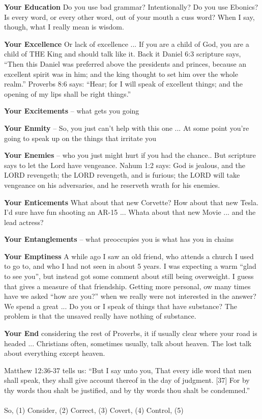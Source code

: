 
\begin{compactenum}[I.][10]
    \item \textbf{Your Education} Do you use bad grammar? Intentionally?  Do you use Ebonics?  Is every word, or every other word, out of your mouth a cuss word?  When I say, though, what I really mean is wisdom. 
    \item \textbf{Your Excellence} Or lack of excellence ... If you are a child of God, you are a child of THE King and should talk like it. Back it Daniel 6:3 scripture says, ``Then this Daniel was preferred above the presidents and princes, because an excellent spirit was in him; and the king thought to set him over the whole realm.'' Proverbs 8:6 says: ``Hear; for I will speak of excellent things; and the opening of my lips shall be right things.''
    \item \textbf{Your Excitements} -- what gets you going
    \item \textbf{Your Enmity} -- So, you just can't help with this one ... At some point you're going to speak up on the things that irritate you 
    \item \textbf{Your Enemies} -- who you just might hurt if you had the chance.. But scripture says to let the Lord have vengeance. Nahum 1:2 says: God is jealous, and the LORD revengeth; the LORD revengeth, and is furious; the LORD will take vengeance on his adversaries, and he reserveth wrath for his enemies.
    \item \textbf{Your Enticements} What about that new Corvette?  How about that new Tesla.  I'd sure have fun shooting an AR-15 ... Whata about that new Movie ... and the lead actress?
    \item \textbf{Your Entanglements} -- what preoccupies you is what has you in chains
    \item \textbf{Your Emptiness} A while ago I saw an old friend, who attends a church I used to go to, and who I had not seen in about 5 years. I was expecting a warm ``glad to see you'', but instead got some comment about still being overweight. I guess that gives a measure of that friendship.  Getting more personal, ow many times have we asked ``how are you?'' when we really were not interested in the answer? We spend a great ... Do you or I speak of things that have substance? The problem is that the unsaved really have nothing of substance.
   \item \textbf{Your End} considering the rest of Proverbs, it if usually clear where your road is headed ... Christians often, sometimes usually, talk about heaven.  The lost talk about everything except heaven.  
\end{compactenum}
Matthew 12:36-37 tells us: ``But I say unto you, That every idle word that men shall speak, they shall give account thereof in the day of judgment. [37] For by thy words thou shalt be justified, and by thy words thou shalt be condemned.''\\
\\
So, (1) Consider, (2) Correct, (3) Covert, (4) Control, (5)

